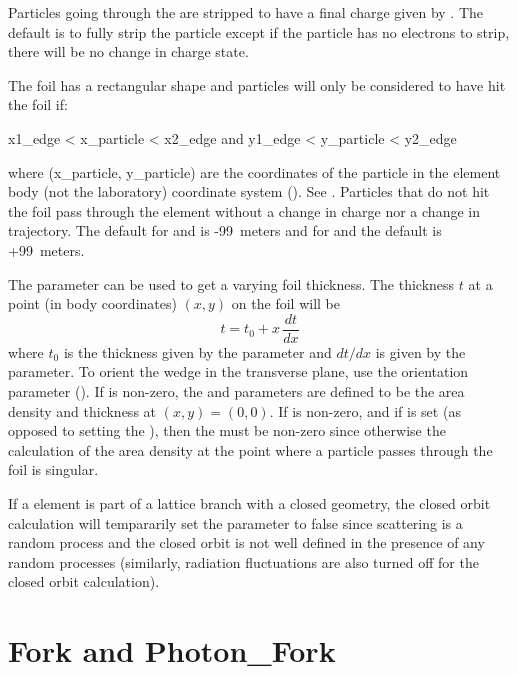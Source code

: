 Particles going through the  are stripped to have a final charge given by
.  The default is to fully strip the particle except if the particle has no
electrons to strip, there will be no change in charge state.

The foil has a rectangular shape and particles will only be considered to have hit the foil if:
\begin{example}
  x1_edge < x_particle < x2_edge  and
  y1_edge < y_particle < y2_edge
\end{example}
where (x_particle, y_particle) are the coordinates of the particle in the element body (not the
laboratory) coordinate system (). See . Particles that do not hit the
foil pass through the element without a change in charge nor a change in trajectory. The default
for  and  is -99~meters and for  and  the default is
+99~meters.

The  parameter can be used to get a varying foil thickness. The thickness $t$ at
a point (in body coordinates) $(x,y)$ on the foil will be
\begin{equation}
  t = t_0 + x \, \frac{dt}{dx}
\end{equation}
where $t_0$ is the thickness given by the  parameter and $dt/dx$ is given by the
 parameter. To orient the wedge in the transverse plane, use the 
orientation parameter (). If  is non-zero, the
 and  parameters are defined to be the area density and thickness at
$(x,y) = (0,0)$. If  is non-zero, and if  is
set (as opposed to setting the ), then the  must be non-zero since otherwise
the calculation of the area density at the point where a particle passes through the foil is singular.

If a  element is part of a lattice branch with a closed geometry, the closed orbit
calculation will tempararily set the  parameter to false since scattering is a random
process and the closed orbit is not well defined in the presence of any random processes (similarly,
radiation fluctuations are also turned off for the closed orbit calculation).

\newpage

\section{Fork and Photon_Fork}
\label{s:fork}

